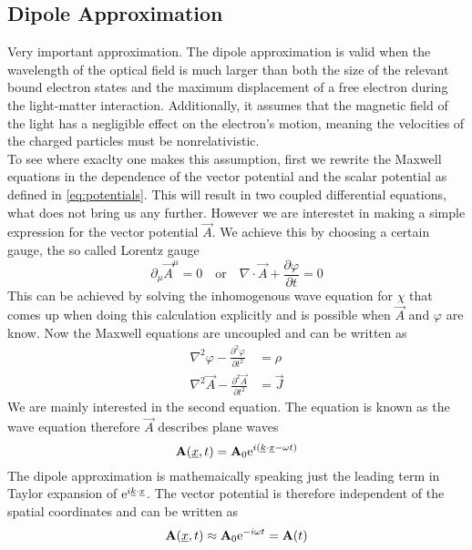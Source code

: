 \subsection{Dipole Approximation}
Very important approximation. 
The dipole approximation is valid when the wavelength of the optical field is much larger than both the size of the relevant bound electron states and the maximum displacement of a free electron during the light-matter interaction. 
Additionally, it assumes that the magnetic field of the light has a negligible effect on the electron's motion, meaning the velocities of the charged particles must be nonrelativistic. \\
To see where exaclty one makes this assumption, first we rewrite the Maxwell equations in the dependence of the vector potential and the scalar potential as defined in \eqref{eq:potentials}. 
This will result in two coupled differential equations, what does not bring us any further. 
However we are interestet in making a simple expression for the vector potential $\vec{A}$.
We achieve this by choosing a certain gauge, the so called Lorentz gauge
\begin{equation*}
    \partial_{\mu} \vec{A}^{\mu} = 0 \quad \text{or} \quad \nabla \cdot \vec{A} + \frac{\partial \varphi}{\partial t} = 0
\end{equation*}
This can be achieved by solving the inhomogenous wave equation for $\chi$ that comes up when doing this calculation explicitly and is possible when $\vec{A}$ and $\varphi$ are know.
Now the Maxwell equations are uncoupled and can be written as
\begin{equation*}
    \begin{aligned}
        \nabla^2 \varphi - \frac{\partial^2 \varphi}{\partial t^2} &= \rho \\
        \nabla^2 \vec{A} - \frac{\partial^2 \vec{A}}{\partial t^2} &= \vec{J} 
    \end{aligned}
\end{equation*}
We are mainly interested in the second equation. The equation is known as the wave equation therefore $\vec{A}$ describes plane waves
\begin{equation*}
    \mathbf{A}(\underline{x}, t) = \mathbf{A}_0 \mathrm{e}^{i (\underline{k} \cdot \underline{x} - \omega t)}
\end{equation*}
The dipole approximation is mathemaically speaking just the leading term in Taylor expansion of $\mathrm{e}^{i\underline{k} \cdot \underline{x}}$. 
The vector potential is therefore independent of the spatial coordinates and can be written as
\begin{equation*}
    \mathbf{A}(\underline{x}, t) \approx \mathbf{A}_0 \mathrm{e}^{- i \omega t} = \mathbf{A}(t)
\end{equation*}
